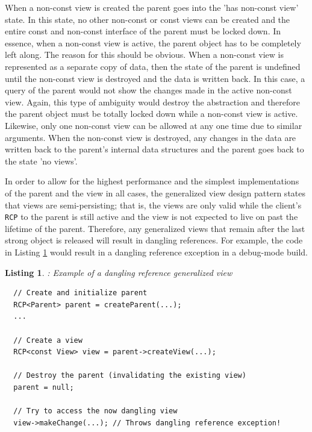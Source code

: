 \documentclass[pdf,ps2pdf,11pt]{SANDreport}
\newtheorem{listing}{Listing}
\begin{document}
When a non-const view is created the parent goes into the 'has
non-const view' state.  In this state, no other non-const or const
views can be created and the entire const and non-const interface of
the parent must be locked down.  In essence, when a non-const view is
active, the parent object has to be completely left along.  The reason
for this should be obvious.  When a non-const view is represented as a
separate copy of data, then the state of the parent is undefined until
the non-const view is destroyed and the data is written back.  In this
case, a query of the parent would not show the changes made in the
active non-const view.  Again, this type of ambiguity would destroy
the abstraction and therefore the parent object must be totally locked
down while a non-const view is active.  Likewise, only one non-const
view can be allowed at any one time due to similar arguments.  When
the non-const view is destroyed, any changes in the data are written
back to the parent's internal data structures and the parent goes back
to the state 'no views'.

In order to allow for the highest performance and the simplest
implementations of the parent and the view in all cases, the generalized
view design pattern states that views are semi-persisting; that is, the
views are only valid while the client's {}\texttt{RCP} to the parent
is still active and the view is not expected to live on past the
lifetime of the parent.  Therefore, any generalized views that remain
after the last strong {} object is released will
result in dangling references.  For example, the code in Listing
{}\ref{listing:generalized-view-dangling} would result in a dangling
reference exception in a debug-mode build.


\begin{listing}:  Example of a dangling reference generalized view  \\
\label{listing:generalized-view-dangling}
{\small\begin{verbatim}
  // Create and initialize parent
  RCP<Parent> parent = createParent(...);
  ...

  // Create a view
  RCP<const View> view = parent->createView(...);

  // Destroy the parent (invalidating the existing view)
  parent = null;

  // Try to access the now dangling view
  view->makeChange(...); // Throws dangling reference exception!
\end{verbatim}}
\end{listing}
\end{document}
